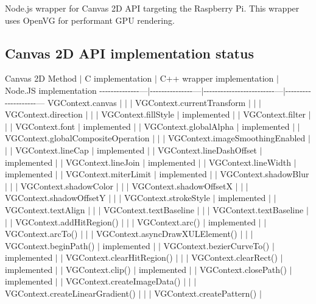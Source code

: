 Node.\+js wrapper for Canvas 2\+D A\+P\+I targeting the Raspberry Pi. This wrapper uses Open\+V\+G for performant G\+P\+U rendering.

\subsection*{Canvas 2\+D A\+P\+I implementation status}

Canvas 2\+D Method $\vert$ C implementation $\vert$ C++ wrapper implementation $\vert$ Node.\+J\+S implementation -\/-\/-\/-\/-\/-\/-\/-\/-\/-\/-\/-\/-\/-\/---$\vert$-\/-\/-\/-\/-\/-\/-\/-\/-\/-\/-\/-\/-\/-\/-\/---$\vert$-\/-\/-\/-\/-\/-\/-\/-\/-\/-\/-\/-\/-\/-\/-\/-\/-\/-\/-\/-\/-\/-\/-\/-\/-\/---$\vert$-\/-\/-\/-\/-\/-\/-\/-\/-\/-\/-\/-\/-\/-\/-\/-\/-\/-\/-\/-\/--- {\ttfamily V\+G\+Context.\+canvas} $\vert$ $\vert$ $\vert$ {\ttfamily V\+G\+Context.\+current\+Transform} $\vert$ $\vert$ $\vert$ {\ttfamily V\+G\+Context.\+direction} $\vert$ $\vert$ $\vert$ {\ttfamily V\+G\+Context.\+fill\+Style} $\vert$ implemented $\vert$ $\vert$ {\ttfamily V\+G\+Context.\+filter} $\vert$ $\vert$ $\vert$ {\ttfamily V\+G\+Context.\+font} $\vert$ implemented $\vert$ $\vert$ {\ttfamily V\+G\+Context.\+global\+Alpha} $\vert$ implemented $\vert$ $\vert$ {\ttfamily V\+G\+Context.\+global\+Composite\+Operation} $\vert$ $\vert$ $\vert$ {\ttfamily V\+G\+Context.\+image\+Smoothing\+Enabled} $\vert$ $\vert$ $\vert$ {\ttfamily V\+G\+Context.\+line\+Cap} $\vert$ implemented $\vert$ $\vert$ {\ttfamily V\+G\+Context.\+line\+Dash\+Offset} $\vert$ implemented $\vert$ $\vert$ {\ttfamily V\+G\+Context.\+line\+Join} $\vert$ implemented $\vert$ $\vert$ {\ttfamily V\+G\+Context.\+line\+Width} $\vert$ implemented $\vert$ $\vert$ {\ttfamily V\+G\+Context.\+miter\+Limit} $\vert$ implemented $\vert$ $\vert$ {\ttfamily V\+G\+Context.\+shadow\+Blur} $\vert$ $\vert$ $\vert$ {\ttfamily V\+G\+Context.\+shadow\+Color} $\vert$ $\vert$ $\vert$ {\ttfamily V\+G\+Context.\+shadow\+Offset\+X} $\vert$ $\vert$ $\vert$ {\ttfamily V\+G\+Context.\+shadow\+Offset\+Y} $\vert$ $\vert$ $\vert$ {\ttfamily V\+G\+Context.\+stroke\+Style} $\vert$ implemented $\vert$ $\vert$ {\ttfamily V\+G\+Context.\+text\+Align} $\vert$ $\vert$ $\vert$ {\ttfamily V\+G\+Context.\+text\+Baseline} $\vert$ $\vert$ $\vert$ {\ttfamily V\+G\+Context.\+text\+Baseline} $\vert$ $\vert$ $\vert$ {\ttfamily V\+G\+Context.\+add\+Hit\+Region()} $\vert$ $\vert$ $\vert$ {\ttfamily V\+G\+Context.\+arc()} $\vert$ implemented $\vert$ $\vert$ {\ttfamily V\+G\+Context.\+arc\+To()} $\vert$ $\vert$ $\vert$ {\ttfamily V\+G\+Context.\+async\+Draw\+X\+U\+L\+Element()} $\vert$ $\vert$ $\vert$ {\ttfamily V\+G\+Context.\+begin\+Path()} $\vert$ implemented $\vert$ $\vert$ {\ttfamily V\+G\+Context.\+bezier\+Curve\+To()} $\vert$ implemented $\vert$ $\vert$ {\ttfamily V\+G\+Context.\+clear\+Hit\+Region()} $\vert$ $\vert$ $\vert$ {\ttfamily V\+G\+Context.\+clear\+Rect()} $\vert$ implemented $\vert$ $\vert$ {\ttfamily V\+G\+Context.\+clip()} $\vert$ implemented $\vert$ $\vert$ {\ttfamily V\+G\+Context.\+close\+Path()} $\vert$ implemented $\vert$ $\vert$ {\ttfamily V\+G\+Context.\+create\+Image\+Data()} $\vert$ $\vert$ $\vert$ {\ttfamily V\+G\+Context.\+create\+Linear\+Gradient()} $\vert$ $\vert$ $\vert$ {\ttfamily V\+G\+Context.\+create\+Pattern()} $\vert$ 